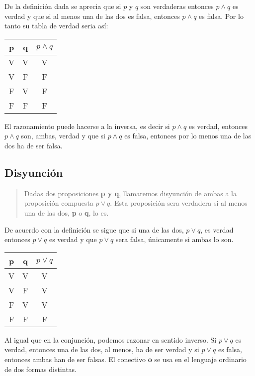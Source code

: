 \documentclass[a4paper,11pt,oneside,titlepage,final]{scrartc}
\begin{document}
De la definición dada se aprecia que si $p$ y $q$ son verdaderas entonces $p \wedge q$ es verdad y que si al menos una de las dos es falsa, entonces $p \wedge q$ es falsa. Por lo tanto su tabla de verdad seria así:\\

\begin{center}
\begin{tabular}{|c|c|c|}
\hline 
p & q & $p \wedge q$ \\ 
\hline 
V & V & V \\ 
\hline 
V & F & F \\ 
\hline 
F & V & F \\ 
\hline 
F & F & F \\ 
\hline 
\end{tabular}
\end{center}

El razonamiento puede hacerse a la inversa, es decir si $p \wedge q$ es verdad, entonces $p \wedge q$ son, ambas, verdad y que si $p \wedge q$ es falsa, entonces por lo menos una de las dos ha de ser falsa.

\subsection{Disyunción}

\begin{quote}
Dadas dos proposiciones \textbf{p y q}, llamaremos disyunción de ambas a la proposición compuesta $p \vee q$. Esta proposición sera verdadera si al menos una de las dos, \textbf{p} o \textbf{q}, lo es.
\end{quote}

De acuerdo con la definición se sigue que si una de las dos, $p \vee q$, es verdad entonces $p \vee q$ es verdad y que $p \vee q$ sera falsa, únicamente si ambas lo son.\\

\begin{center}
\begin{tabular}{|c|c|c|}
\hline 
p & q & $p \vee q$ \\ 
\hline 
V & V & V \\ 
\hline 
V & F & V \\ 
\hline 
F & V & V \\ 
\hline 
F & F & F \\ 
\hline 
\end{tabular}
\end{center}

Al igual que en la conjunción, podemos razonar en sentido inverso. Si $p \vee q$ es verdad, entonces una de las dos, al menos, ha de ser verdad y si $p \vee q$ es falsa, entonces ambas han de ser falsas. El conectivo \textbf{o} se usa en el lenguaje ordinario de dos formas distintas.
\end{document}
